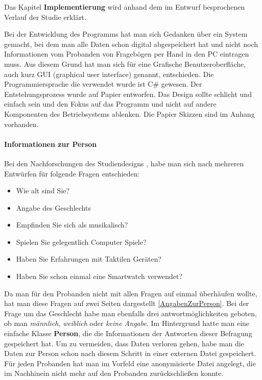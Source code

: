 
Das Kapitel \textbf{Implementierung} wird anhand dem im Entwurf besprochenen Verlauf der Studie erkl{\"a}rt.

Bei der Entwicklung des Programms hat man sich Gedanken {\"u}ber ein System gemacht, bei dem man alle Daten schon digital abgespeichert hat und nicht noch Informationen vom Probanden von Fragebögen per Hand in den PC eintragen muss. Aus diesem Grund hat man sich f{\"u}r eine Grafische Benutzeroberfl{\"a}che, auch kurz GUI (graphical user interface) genannt, entschieden. 
Die Programmiersprache die verwendet wurde ist C\# gewesen.
Der Entstehungsprozess wurde auf Papier entworfen. Das Design sollte schlicht und einfach sein und den Fokus auf das Programm und nicht auf andere Komponenten des Betriebsystems ablenken. Die Papier Skizzen sind im Anhang vorhanden.

\paragraph{Informationen zur Person}
Bei den Nachforschungen des Studiendesigns \cite{benyon2005designing}, habe man sich nach mehreren Entw{\"u}rfen f{\"u}r folgende Fragen entschieden:

\begin{itemize}
\item Wie alt sind Sie?
\item Angabe des Geschlechts
\item Empfinden Sie sich als musikalisch? 
\item Spielen Sie gelegentlich Computer Spiele?
\item Haben Sie Erfahrungen mit Taktilen Ger{\"a}ten?
\item Haben Sie schon einmal eine Smartwatch verwendet?
\end{itemize}

Da man f{\"u}r den Probanden nicht mit allen Fragen auf einmal {\"u}berh{\"a}ufen wollte, hat man diese Fragen auf zwei Seiten dargestellt \autoref{AngabenZurPerson}. Bei der Frage um das Geschlecht habe man ebenfalls drei antwortmöglichkeiten geboten, ob man \textit{männlich}, \textit{weiblich} oder \textit{keine Angabe}.
Im Hintergrund hatte man eine einfache Klasse \textbf{Person}, die die Informationen der Antworten dieser Befragung gespeichert hat. Um zu vermeiden, dass Daten verloren gehen, habe man die Daten zur Person schon nach diesem Schritt in einer externen Datei gespeichert. F{\"u}r jeden Probanden hat man im Vorfeld eine anonymisierte Datei angelegt, die im Nachhinein nicht mehr auf den Probanden zur{\"u}ckschlie{\ss}en konnte.  


